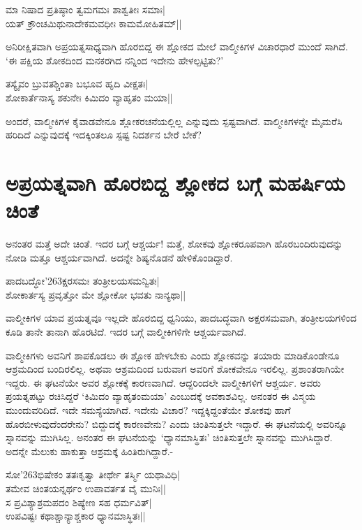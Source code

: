 \begin{shloka}
ಮಾ ನಿಷಾದ ಪ್ರತಿಷ್ಠಾಂ ತ್ವಮಗಮಃ ಶಾಶ್ವತೀಃ ಸಮಾಃ|\\ 
ಯತ್‍ ಕ್ರೌಂಚಮಿಥುನಾದೇಕಮವಧೀಃ ಕಾಮಮೋಹಿತಮ್‍||
\end{shloka}

ಅನಿರೀಕ್ಷಿತವಾಗಿ ಅಪ್ರಯತ್ನಸಾಧ್ಯವಾಗಿ ಹೊರಬಿದ್ದ ಈ ಶ್ಲೋಕದ ಮೇಲೆ ವಾಲ್ಮೀಕಿಗಳ ವಿಚಾರಧಾರೆ ಮುಂದೆ ಸಾಗಿದೆ. `ಈ ಪಕ್ಷಿಯ ಶೋಕದಿಂದ ಮನಕರಗಿದ ನನ್ನಿಂದ ಇದೇನು ಹೇಳಲ್ಪಟ್ಟಿತು?' 

\begin{shloka} 
ತಸ್ಯೈವಂ ಬ್ರುವತಶ್ಚಿಂತಾ ಬಭೂವ ಹೃದಿ ವೀಕ್ಷತಃ|\\ 
ಶೋಕಾರ್ತೆನಾಸ್ಯ ಶಕುನೇಃ ಕಿಮಿದಂ ವ್ಯಾಹೃತಂ ಮಯಾ||
\end{shloka}

ಅಂದರೆ, ವಾಲ್ಮೀಕಿಗಳ ಕೈವಾಡವೇನೂ ಶ್ಲೋಕರಚನೆಯಲ್ಲಿಲ್ಲ ಎನ್ನುವುದು ಸ್ಪಷ್ಟವಾಗಿದೆ. ವಾಲ್ಮೀಕಿಗಳನ್ನೇ ಮೈಮರೆಸಿ ಹರಿದಿದೆ ಎನ್ನುವುದಕ್ಕೆ ಇದಕ್ಕಿಂತಲೂ ಸ್ಪಷ್ಟ ನಿದರ್ಶನ ಬೇರೆ ಬೇಕೆ? 

\section*{ಅಪ್ರಯತ್ನವಾಗಿ ಹೊರಬಿದ್ದ ಶ್ಲೋಕದ ಬಗ್ಗೆ ಮಹರ್ಷಿಯ ಚಿಂತೆ} 

ಅನಂತರ ಮತ್ತೆ ಅದೇ ಚಿಂತೆ. ಇದರ ಬಗ್ಗೆ ಆಶ್ಚರ್ಯ! ಮತ್ತೆ, ಶೋಕವು ಶ್ಲೋಕರೂಪವಾಗಿ ಹೊರಬಂದಿರುವುದನ್ನು ನೋಡಿ ಮತ್ತೂ ಆಶ್ಚರ್ಯವಾಗಿದೆ. ಅದನ್ನೇ ಶಿಷ್ಯನೊಡನೆ ಹೇಳಿಕೊಂಡಿದ್ದಾರೆ. 

\begin{shloka} 
ಪಾದಬದ್ಧೋ\char'263ಕ್ಷರಸಮಃ ತಂತ್ರೀಲಯಸಮನ್ವಿತಃ|\\ 
ಶೋಕಾರ್ತಸ್ಯ ಪ್ರವೃತ್ತೋ ಮೇ ಶ್ಲೋಕೋ ಭವತು ನಾನ್ಯಥಾ||
\end{shloka}


ವಾಲ್ಮೀಕಿಗಳ ಯಾವ ಪ್ರಯತ್ನವೂ ಇಲ್ಲದೇ ಹೊರಬಿದ್ದ ಧ್ವನಿಯು, ಪಾದಬದ್ಧವಾಗಿ ಅಕ್ಷರಸಮವಾಗಿ, ತಂತ್ರೀಲಯಗಳಿಂದ ಕೂಡಿ ತಾನೇ ತಾನಾಗಿ ಹೊರಟಿದೆ. ಇದರ ಬಗ್ಗೆ ವಾಲ್ಮೀಕಿಗಳಿಗೇ ಆಶ್ಚರ್ಯವಾಗಿದೆ. 

ವಾಲ್ಮೀಕಿಗಳು ಅವನಿಗೆ ಶಾಪಕೊಡಲು ಈ ಶ್ಲೋಕ ಹೇಳಬೇಕು ಎಂದು ಶ್ಲೋಕವನ್ನು ತಯಾರು ಮಾಡಿಕೊಂಡೇನೂ ಆಶ್ರಮದಿಂದ ಬಂದಿರಲಿಲ್ಲ. ಅಥವಾ ಆಶ್ರಮದಿಂದ ಬರುವಾಗ ಅವರಿಗೆ ಶೋಕವೇನೂ ಇರಲಿಲ್ಲ. ಪ್ರಶಾಂತರಾಗಿಯೇ ಇದ್ದರು. ಈ ಘಟನೆಯೇ ಅವರ ಶ್ಲೋಕಕ್ಕೆ ಕಾರಣವಾಗಿದೆ. ಆದ್ದರಿಂದಲೇ ವಾಲ್ಮೀಕಿಗಳಿಗೆ ಆಶ್ಚರ್ಯ. ಅವರು ಪ್ರಯತ್ನಪಟ್ಟು ರಚಿಸಿದ್ದರೆ `ಕಿಮಿದಂ ವ್ಯಾಹೃತಂಮಯಾ' ಎಂಬುದಕ್ಕೆ ಅವಕಾಶವಿಲ್ಲ. ಅನಂತರ ಈ ವಿಸ್ಮಯ ಮುಂದುವರಿದಿದೆ. ಇದೇ ಸಮಸ್ಯೆಯಾಗಿದೆ. ಇದೇನು ವಿಚಾರ? ಇದ್ದಕ್ಕಿದ್ದಂತೆಯೇ ಶೋಕವು ಹಾಗೆ ಹೊರಬೀಳುವುದೆಂದರೇನು? ಬಿದ್ದುದಕ್ಕೆ ಕಾರಣವೇನು? ಎಂದು ಚಿಂತಿಸುತ್ತಲೇ ಇದ್ದಾರೆ. ಈ ಘಟನೆಯಲ್ಲಿ ಅವರಿನ್ನೂ ಸ್ನಾನವನ್ನು ಮುಗಿಸಿಲ್ಲ. ಅನಂತರ ಈ ಘಟನೆಯನ್ನು `ಧ್ಯಾನಮಾಸ್ಥಿತಃ' ಚಿಂತಿಸುತ್ತಲೇ ಸ್ನಾನವನ್ನು ಮುಗಿಸಿದ್ದಾರೆ. ಅದನ್ನೇ ಮೆಲುಕು ಹಾಕುತ್ತಾ ಆಶ್ರಮಕ್ಕೆ ಹಿಂತಿರುಗಿದ್ದಾರೆ.- 

\begin{shloka}
ಸೋ\char'263ಭಿಷೇಕಂ ತತಃಕೃತ್ವಾ ತೀರ್ಥೇ ತರ್ಸ್ಮಿ ಯಥಾವಿಧಿ|\\ 
ತಮೇವ ಚಿಂತಯನ್ನರ್ಥಂ ಉಪಾವರ್ತತ ವೈ ಮುನಿಃ||\\ 
ಸ ಪ್ರವಿಶ್ಯಾಶ್ರಮಪದಂ ಶಿಷ್ಯೇಣ ಸಹ ಧರ್ಮವಿತ್‍|\\ 
ಉಪವಿಷ್ಟಃ ಕಥಾಶ್ಚಾನ್ಯಾಶ್ಚಕಾರ ಧ್ಯಾನಮಾಸ್ಥಿತಃ||
\end{shloka}


